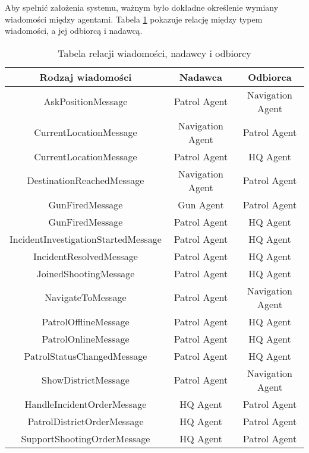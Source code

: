 \par Aby spełnić założenia systemu, ważnym było dokładne określenie wymiany wiadomości między agentami. Tabela \ref{tab:agentsMessagesSenderReceiver} pokazuje relację między typem wiadomości, a jej odbiorcą i nadawcą.

\begin{table}
    \centering
    \begin{tabular}{|c|c|c|} 
     \hline
     Rodzaj wiadomości & Nadawca & Odbiorca \\
     \hline
     \hline
     AskPositionMessage & Patrol Agent & Navigation Agent \\ 
     \hline
     CurrentLocationMessage & Navigation Agent & Patrol Agent \\ 
     \hline
     CurrentLocationMessage & Patrol Agent & HQ Agent \\ 
     \hline
     DestinationReachedMessage & Navigation Agent & Patrol Agent \\ 
     \hline
     GunFiredMessage & Gun Agent & Patrol Agent \\ 
     \hline
     GunFiredMessage & Patrol Agent & HQ Agent \\ 
     \hline
     IncidentInvestigationStartedMessage & Patrol Agent & HQ Agent \\ 
     \hline
     IncidentResolvedMessage & Patrol Agent & HQ Agent \\ 
     \hline
     JoinedShootingMessage & Patrol Agent & HQ Agent \\ 
     \hline
     NavigateToMessage & Patrol Agent & Navigation Agent \\ 
     \hline
     PatrolOfflineMessage & Patrol Agent & HQ Agent \\ 
     \hline
     PatrolOnlineMessage & Patrol Agent & HQ Agent \\ 
     \hline
     PatrolStatusChangedMessage & Patrol Agent & HQ Agent \\ 
     \hline
     ShowDistrictMessage & Patrol Agent & Navigation Agent \\ 
     \hline
     HandleIncidentOrderMessage & HQ Agent & Patrol Agent \\ 
     \hline
     PatrolDistrictOrderMessage & HQ Agent & Patrol Agent \\ 
     \hline
     SupportShootingOrderMessage & HQ Agent & Patrol Agent \\ 
     \hline
    \end{tabular}
    \caption{Tabela relacji wiadomości, nadawcy i odbiorcy}
    \label{tab:agentsMessagesSenderReceiver}
\end{table}

